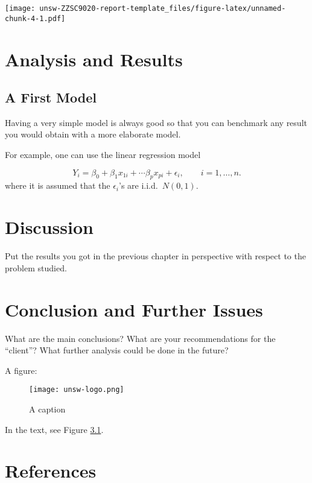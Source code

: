 \documentclass[mstat,12pt]{unswthesis}
\begin{document}
\texttt{[image: unsw-ZZSC9020-report-template\_files/figure-latex/unnamed-chunk-4-1.pdf]}

\hypertarget{analysis-and-results}{%
\chapter{Analysis and Results}\label{analysis-and-results}}

\hypertarget{a-first-model}{%
\section{A First Model}\label{a-first-model}}

Having a very simple model is always good so that you can benchmark any
result you would obtain with a more elaborate model.

\bigskip

For example, one can use the linear regression model

\[
Y_i = \beta_0 + \beta_1 x_{1i} + \cdots \beta_p x_{pi} + \epsilon_i, \qquad i=1,\ldots,n.
\] where it is assumed that the \(\epsilon_i\)'s are i.i.d.~\(N(0,1)\).

\hypertarget{discussion}{%
\chapter{Discussion}\label{discussion}}

Put the results you got in the previous chapter in perspective with
respect to the problem studied.

\hypertarget{conclusion-and-further-issues}{%
\chapter{Conclusion and Further
Issues}\label{conclusion-and-further-issues}}

What are the main conclusions? What are your recommendations for the
``client''? What further analysis could be done in the future?

A figure:

\begin{figure}
\centering
\texttt{[image: unsw-logo.png]}
\caption{A caption \label{myfigure}}
\end{figure}

In the text, see Figure \ref{myfigure}.

\hypertarget{references}{%
\chapter*{References}\label{references}}
\end{document}

